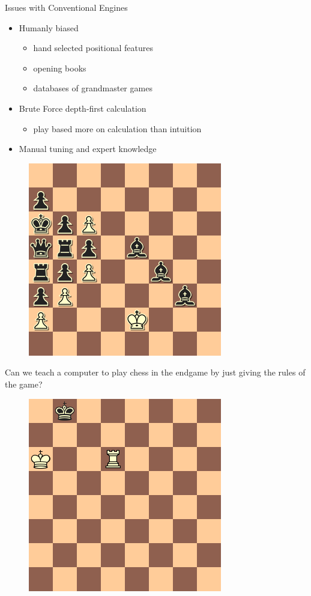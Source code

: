 \documentclass{beamer}
\begin{document}
\begin{frame}{Issues with Conventional Engines}
	\begin{itemize}
		\item Humanly biased
    		\begin{itemize}
    			\item hand selected positional features
            	\item opening books
                \item databases of grandmaster games
    		\end{itemize}
        \item Brute Force depth-first calculation
        	\begin{itemize}
        		\item play based more on calculation than intuition 
        	\end{itemize}
        \item Manual tuning and expert knowledge
	\end{itemize}
    \begin{figure}
		\includegraphics[scale=0.3]{diagram__3_}
	\end{figure}
\end{frame}

\begin{frame}
	Can we teach a computer to play chess in the endgame by just giving the rules of the game?
    \begin{figure}
		\includegraphics[scale=0.4]{fig/search/3}
	\end{figure}
\end{frame}
\end{document}
